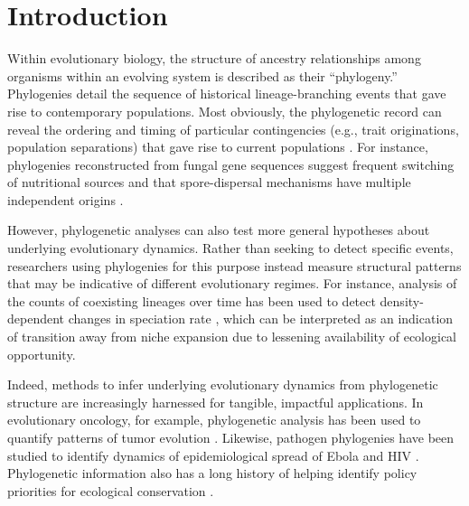 \section{Introduction}
\label{sec:introduction}

Within evolutionary biology, the structure of ancestry relationships among organisms within an evolving system is described as their ``phylogeny.''
Phylogenies detail the sequence of historical lineage-branching events that gave rise to contemporary populations.
Most obviously, the phylogenetic record can reveal the ordering and timing of particular contingencies (e.g., trait originations, population separations) that gave rise to current populations \citep{pagel1999inferring,arbogast2002estimating}.
For instance, phylogenies reconstructed from fungal gene sequences suggest frequent switching of nutritional sources and that spore-dispersal mechanisms have multiple independent origins \citep{james2006reconstructing}.

However, phylogenetic analyses can also test more general hypotheses about underlying evolutionary dynamics.
Rather than seeking to detect specific events, researchers using phylogenies for this purpose instead measure structural patterns that may be indicative of different evolutionary regimes.
For instance, analysis of the counts of coexisting lineages over time has been used to detect density-dependent changes in speciation rate \citep{rabosky2008density}, which can be interpreted as an indication of transition away from niche expansion due to lessening availability of ecological opportunity.

Indeed, methods to infer underlying evolutionary dynamics from phylogenetic structure are increasingly harnessed for tangible, impactful applications.
In evolutionary oncology, for example, phylogenetic analysis has been used to quantify patterns of tumor evolution \citep{scottInferringTumorProliferative2020,lewinsohnStatedependentEvolutionaryModels2023}.
Likewise, pathogen phylogenies have been studied to identify dynamics of epidemiological spread of Ebola and HIV \citep{giardina2017inference,saulnier2017inferring,voznica2022deep}.
Phylogenetic information also has a long history of helping identify policy priorities for ecological conservation \citep{forestPreservingEvolutionaryPotential2007}.

